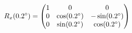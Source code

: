 \documentclass[preview]{standalone}
\begin{document}
\begin{align*}
\special{dvisvgm:raw <g id='unique000'>}R_x(0.2^\circ) = \begin{pmatrix} 1 & 0 & 0 \\ 0 & \cos(0.2^\circ) & -\sin(0.2^\circ) \\ 0 & \sin(0.2^\circ) & \cos(0.2^\circ) \end{pmatrix}\special{dvisvgm:raw </g>}
\end{align*}
\end{document}
